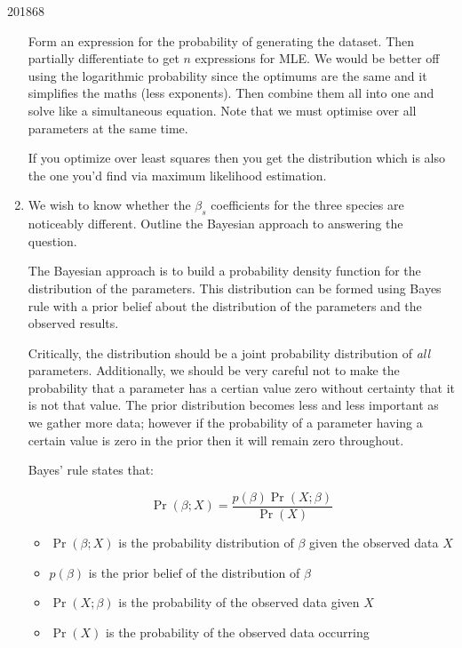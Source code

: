 \documentclass[10pt,\jkfside,a4paper]{article}
\begin{document}
\begin{examquestion}{2018}{6}{8}
\begin{enumerate}[label=(\alph*)]
Form an expression for the probability of generating the dataset. Then
partially differentiate to get $n$ expressions for MLE. We would be
better off using the logarithmic probability since the optimums are the
same and it simplifies the maths (less exponents). Then combine them all
into one and solve like a simultaneous equation. Note that we must optimise
over all parameters at the same time.

If you optimize over least squares then you get the distribution which
is also the one you'd find via maximum likelihood estimation.

\fi

\item We wish to know whether the $\beta_s$ coefficients for the three
species are noticeably different. Outline the Bayesian approach to answering
the question.


The Bayesian approach is to build a probability density function for the
distribution of the parameters. This distribution can be formed using Bayes
rule with a prior belief about the distribution of the parameters and the
observed results.

Critically, the distribution should be a joint probability distribution of
\textit{all} parameters. Additionally, we should be very careful not to make
the probability that a parameter has a certian value zero without
certainty that it is not that value. The prior distribution becomes less and
less important as we gather more data; however if the probability of a
parameter having a certain value is zero in the prior then it will remain
zero throughout.

Bayes' rule states that:

\[
\Pr(\beta; X) = \frac{p(\beta)\Pr(X; \beta)}{\Pr(X)}
\]

\begin{itemize}

\item $\Pr(\beta; X)$ is the probability distribution of $\beta$ given the
observed data $X$

\item $p(\beta)$ is the prior belief of the distribution of $\beta$

\item $\Pr(X; \beta)$ is the probability of the observed data given $X$

\item $\Pr(X)$ is the probability of the observed data occurring


\end{itemize}
\end{enumerate}
\end{examquestion}
\end{document}
